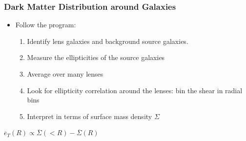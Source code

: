 \documentclass{beamer}
\begin{document}
\frame
{
    \frametitle{Dark Matter Distribution around Galaxies}


    \begin{itemize}

        \item Follow the program:
            \begin{enumerate}

                \item Identify lens galaxies and background source galaxies.

                \item Measure the ellipticities of the source galaxies

                \item Average over many lenses

                \item Look for ellipticity correlation around the lenses: bin
                    the shear in radial bins

                \item Interpret in terms of surface mass density {\color{gold}
                    $\Sigma$}

            \end{enumerate}
    \end{itemize}

    \begin{center}
        {\color{gold}
            {\huge
                $\overline{e}_{T}(R) \propto \overline{\Sigma}(<R) - \overline{\Sigma}(R)$
            }
        }
    \end{center}
}
\end{document}
